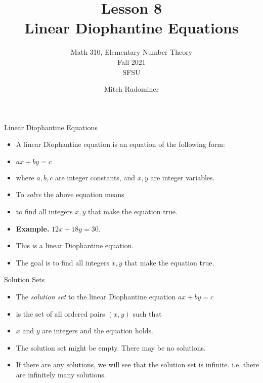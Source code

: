 \documentclass{beamer}
\title{Lesson 8 \\ Linear Diophantine Equations}
\subtitle{Math 310, Elementary Number Theory \\ Fall 2021 \\ SFSU}
\author{Mitch Rudominer}
\date{}
\begin{document}
\begin{frame}
  \titlepage
\end{frame}

\begin{frame}{Linear Diophantine Equations}

\begin{itemize}
  \item A linear Diophantine equation is an equation of the following form:
  \item $ax + by = c$
  \item where $a,b,c$ are integer constants, and $x,y$ are integer variables.
  \item To \emph{solve} the above equation means
  \item to find all integers $x,y$ that make the equation true.
  \item \textbf{Example.} $12x + 18y = 30$.
  \item This is a linear Diophantine equation.
  \item The goal is to find all integers $x,y$ that make the equation true.
\end{itemize}

\end{frame}


\begin{frame}{Solution Sets}

\begin{itemize}
  \item The \emph{solution set} to the linear Diophantine equation $ax + by = c$
  \item is the set of all ordered pairs $(x,y)$ such that
  \item $x$ and $y$ are integers and the equation holds.
  \item The solution set might be empty. There may be no solutions.
  \item If there are any solutions, we will see that the solution set is infinite. i.e. there are
  infinitely many solutions.
\end{itemize}

\end{frame}

\end{document}
